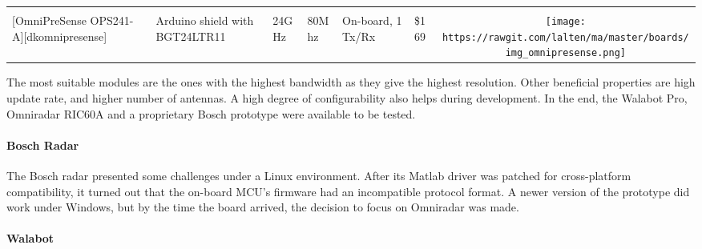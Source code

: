 \begin{longtable}[]{@{}llllllc@{}}
\begin{minipage}[t]{0.10\columnwidth}
\end{minipage}\tabularnewline
\begin{minipage}[t]{0.09\columnwidth}\raggedright\strut
{[}OmniPreSense OPS241-A{]}{[}dkomnipresense{]}\strut
\end{minipage} & \begin{minipage}[t]{0.13\columnwidth}\raggedright\strut
Arduino shield with BGT24LTR11\strut
\end{minipage} & \begin{minipage}[t]{0.09\columnwidth}\raggedright\strut
24GHz\strut
\end{minipage} & \begin{minipage}[t]{0.11\columnwidth}\raggedright\strut
80Mhz\strut
\end{minipage} & \begin{minipage}[t]{0.10\columnwidth}\raggedright\strut
On-board, 1 Tx/Rx\strut
\end{minipage} & \begin{minipage}[t]{0.15\columnwidth}\raggedright\strut
\$169\strut
\end{minipage} & \begin{minipage}[t]{0.10\columnwidth}\centering\strut
\texttt{[image: https://rawgit.com/lalten/ma/master/boards/img\_omnipresense.png]}\strut
\end{minipage}\tabularnewline
\bottomrule
\end{longtable}

The most suitable modules are the ones with the highest bandwidth as
they give the highest resolution. Other beneficial properties are high
update rate, and higher number of antennas. A high degree of
configurability also helps during development. In the end, the Walabot
Pro, Omniradar RIC60A and a proprietary Bosch prototype were available
to be tested.

\paragraph{Bosch Radar}\label{bosch-radar}

The Bosch radar presented some challenges under a Linux environment.
After its Matlab driver was patched for cross-platform compatibility, it
turned out that the on-board MCU's firmware had an incompatible protocol
format. A newer version of the prototype did work under Windows, but by
the time the board arrived, the decision to focus on Omniradar was made.

\paragraph{Walabot}\label{walabot}

